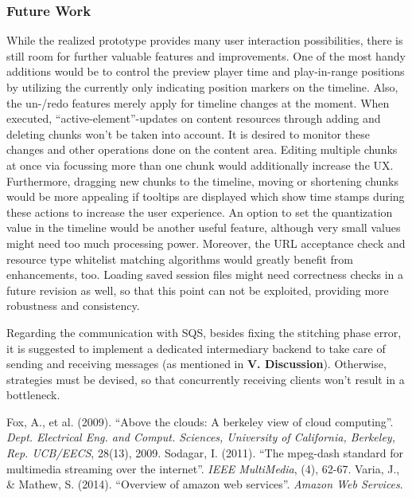 \documentclass[conference]{IEEEtran}
\begin{document}
\subsubsection*{Future Work}
While the realized prototype provides many user interaction possibilities, there is still room for further valuable features and improvements.
One of the most handy additions would be to control the preview player time and play-in-range positions by utilizing the currently only indicating position markers on the timeline.
Also, the un-/redo features merely apply for timeline changes at the moment.
When executed, ``active-element''-updates on content resources through adding and deleting chunks won't be taken into account.
It is desired to monitor these changes and other operations done on the content area.
Editing multiple chunks at once via focussing more than one chunk would additionally increase the UX.
Furthermore, dragging new chunks to the timeline, moving or shortening chunks would be more appealing if tooltips are displayed which show time stamps during these actions to increase the user experience.
An option to set the quantization value in the timeline would be another useful feature, although very small values might need too much processing power.
Moreover, the URL acceptance check and resource type whitelist matching algorithms would greatly benefit from enhancements, too.
Loading saved session files might need correctness checks in a future revision as well, so that this point can not be exploited, providing more robustness and consistency.

Regarding the communication with SQS, besides fixing the stitching phase error, it is suggested to implement a dedicated intermediary backend to take care of sending and receiving messages (as mentioned in \textbf{V. Discussion}).
Otherwise, strategies must be devised, so that concurrently receiving clients won't result in a bottleneck.

\begin{thebibliography}{00}
 Fox, A., et al. (2009). ``Above the clouds: A berkeley view of cloud computing''. \textit{Dept. Electrical Eng. and Comput. Sciences, University of California, Berkeley, Rep. UCB/EECS}, 28(13), 2009. %
 Sodagar, I. (2011). ``The mpeg-dash standard for multimedia streaming over the internet''. \textit{IEEE MultiMedia}, (4), 62-67.
 Varia, J., \& Mathew, S. (2014). ``Overview of amazon web services''. \textit{Amazon Web Services}. %
\end{thebibliography}
\end{document}
